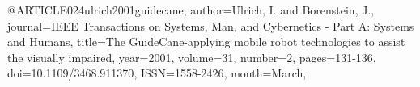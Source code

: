 @ARTICLE{024ulrich2001guidecane,
author={Ulrich, I. and Borenstein, J.},
journal={IEEE Transactions on Systems, Man, and Cybernetics - Part A: Systems and Humans}, 
title={The GuideCane-applying mobile robot technologies to assist the visually impaired}, 
year={2001},
volume={31},
number={2},
pages={131-136},
doi={10.1109/3468.911370},
ISSN={1558-2426},
month={March},}